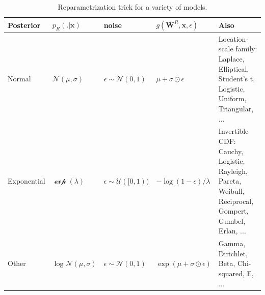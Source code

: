 \documentclass[10pt,letterpaper]{article}
\def\z{\mathbf{z}}
\def\W{\mathbf{W}}
\def\x{\mathbf{x}}
\begin{document}
\begin{table}[H]
  \begin{tabular}{p{1.7cm}|p{1.5cm}|p{1.9cm}|p{2.1cm}|p{5cm}}
         \hline
         Posterior & $p_R(.|\x)$ & noise & $g(\W^R,\x,\epsilon)$ & Also \\ \hline
         Normal & $\mathcal N(\mu,\sigma)$ & $\epsilon \sim \mathcal N(0, 1)$ & $\mu + \sigma \odot \epsilon$ & Location-scale family: Laplace, Elliptical,
         Student’s t, Logistic, Uniform, Triangular, ... \\ \hline
         Exponential & $\mathcal \exp(\lambda)$ & $\epsilon \sim \mathcal U([0, 1))$ & $-\log(1-\epsilon)/\lambda$ & Invertible CDF: Cauchy, Logistic, Rayleigh, Pareta, Weibull, Reciprocal, Gompert, Gumbel, Erlan, ... \\ \hline
         Other & $\log\mathcal N(\mu,\sigma)$ & $\epsilon \sim \mathcal N(0, 1)$ & $\exp(\mu + \sigma \odot \epsilon)$ & Gamma, Dirichlet, Beta, Chi-squared, F, ... \\ \hline
  \end{tabular}
  \caption{Reparametrization trick \citep{kingma2013auto} for a variety of models.}
  \label{tab:rptrick}
\end{table}

\end{document}
